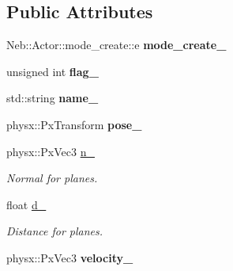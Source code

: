 \subsection*{\-Public \-Attributes}
\begin{DoxyCompactItemize}
\item 
\hypertarget{classNeb_1_1Actor_1_1Util_1_1Raw_a663f694b0585b89e0c812bca7ac648b2}{\-Neb\-::\-Actor\-::mode\-\_\-create\-::e {\bfseries mode\-\_\-create\-\_\-}}\label{classNeb_1_1Actor_1_1Util_1_1Raw_a663f694b0585b89e0c812bca7ac648b2}

\item 
\hypertarget{classNeb_1_1Actor_1_1Util_1_1Raw_afb5e7dc61f81b2a46540ca3950f8986b}{unsigned int {\bfseries flag\-\_\-}}\label{classNeb_1_1Actor_1_1Util_1_1Raw_afb5e7dc61f81b2a46540ca3950f8986b}

\item 
\hypertarget{classNeb_1_1Actor_1_1Util_1_1Raw_a8051b7e615563eb672ae866f8e1eda41}{std\-::string {\bfseries name\-\_\-}}\label{classNeb_1_1Actor_1_1Util_1_1Raw_a8051b7e615563eb672ae866f8e1eda41}

\item 
\hypertarget{classNeb_1_1Actor_1_1Util_1_1Raw_a6465539ecb39006f028d53b18bf863d4}{physx\-::\-Px\-Transform {\bfseries pose\-\_\-}}\label{classNeb_1_1Actor_1_1Util_1_1Raw_a6465539ecb39006f028d53b18bf863d4}

\item 
\hypertarget{classNeb_1_1Actor_1_1Util_1_1Raw_ae406e5f06446cf59a4a8bc497558a108}{physx\-::\-Px\-Vec3 \hyperlink{classNeb_1_1Actor_1_1Util_1_1Raw_ae406e5f06446cf59a4a8bc497558a108}{n\-\_\-}}\label{classNeb_1_1Actor_1_1Util_1_1Raw_ae406e5f06446cf59a4a8bc497558a108}

\begin{DoxyCompactList}\small\item\em \-Normal for planes. \end{DoxyCompactList}\item 
\hypertarget{classNeb_1_1Actor_1_1Util_1_1Raw_afc9237b8b83472e7e15ab8d8f0f00511}{float \hyperlink{classNeb_1_1Actor_1_1Util_1_1Raw_afc9237b8b83472e7e15ab8d8f0f00511}{d\-\_\-}}\label{classNeb_1_1Actor_1_1Util_1_1Raw_afc9237b8b83472e7e15ab8d8f0f00511}

\begin{DoxyCompactList}\small\item\em \-Distance for planes. \end{DoxyCompactList}\item 
\hypertarget{classNeb_1_1Actor_1_1Util_1_1Raw_a95b83aa1ee8857e7bf8f7c338639ac3a}{physx\-::\-Px\-Vec3 {\bfseries velocity\-\_\-}}\label{classNeb_1_1Actor_1_1Util_1_1Raw_a95b83aa1ee8857e7bf8f7c338639ac3a}


\end{DoxyCompactItemize}
